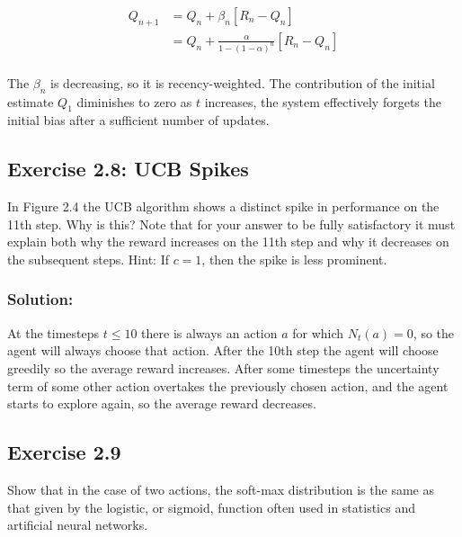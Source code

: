 \begin{equation}
    \begin{aligned}
        Q_{n+1} &= Q_n + \beta_n \left[ R_n - Q_n \right] \\
        &= Q_n + \frac{\alpha}{1-\left(1-\alpha\right)^{n}} \left[ R_n - Q_n \right] \\
    \end{aligned}
\end{equation}

The $\beta_n$ is decreasing, so it is recency-weighted. The contribution of the initial estimate $Q_1$ diminishes to zero as $t$ increases, the system effectively forgets the initial bias after a sufficient number of updates.

\subsection*{Exercise 2.8: UCB Spikes}
In Figure 2.4 the UCB algorithm shows a distinct spike
in performance on the 11th step. Why is this? Note that for your answer to be fully
satisfactory it must explain both why the reward increases on the 11th step and why it
decreases on the subsequent steps. Hint: If $c = 1$, then the spike is less prominent.

\subsubsection*{Solution:}


At the timesteps $t \leq 10$ there is always an action $a$ for which $N_t(a) = 0$, so the agent will always choose that action. After the 10th step the agent will choose greedily so the average reward increases. After some timesteps the uncertainty term of some other action overtakes the previously chosen action, and the agent starts to explore again, so the average reward decreases.

\subsection*{Exercise 2.9}
Show that in the case of two actions, the soft-max distribution is the same
as that given by the logistic, or sigmoid, function often used in statistics and artificial
neural networks.

